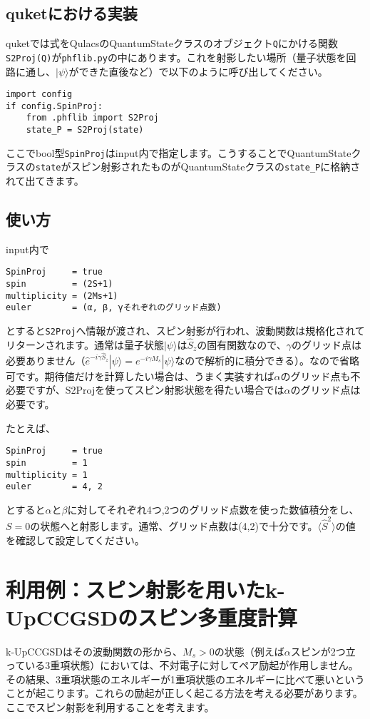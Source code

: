 \documentclass[prb,amsmath,amsfonts,amssymb]{revtex4}
\begin{document}
\subsection{quketにおける実装}
quketでは式\label{eq:Ps}をQulacsのQuantumStateクラスのオブジェクト{\tt Q}にかける関数{\tt S2Proj(Q)}が{\tt phflib.py}の中にあります。これを射影したい場所（量子状態を回路に通し、$|\psi\rangle$ができた直後など）で以下のように呼び出してください。

\begin{Verbatim}[frame=single, xleftmargin=4mm, xrightmargin=10mm]
import config
if config.SpinProj:
    from .phflib import S2Proj
    state_P = S2Proj(state)
\end{Verbatim}
ここでbool型{\tt SpinProj}はinput内で指定します。こうすることでQuantumStateクラスの{\tt state}がスピン射影されたものがQuantumStateクラスの{\tt state\_P}に格納されて出てきます。


\subsection{使い方}
input内で
\begin{Verbatim}[frame=single, xleftmargin=4mm, xrightmargin=10mm]
SpinProj     = true
spin         = (2S+1)
multiplicity = (2Ms+1)
euler        = (α, β, γそれぞれのグリッド点数)
\end{Verbatim}
とすると{\tt S2Proj}へ情報が渡され、スピン射影が行われ、波動関数は規格化されてリターンされます。通常は量子状態$|\psi\rangle$は$\hat S_z$の固有関数なので、$\gamma$のグリッド点は必要ありません（$\hat e^{-i\gamma\hat S_z}|\psi\rangle = e^{-i \gamma M_s}|\psi\rangle$なので解析的に積分できる）。なので省略可です。期待値だけを計算したい場合は、うまく実装すれば$\alpha$のグリッド点も不必要ですが、S2Projを使ってスピン射影状態を得たい場合では$\alpha$のグリッド点は必要です。

たとえば、
\begin{Verbatim}[frame=single, xleftmargin=4mm, xrightmargin=10mm]
SpinProj     = true
spin         = 1
multiplicity = 1
euler        = 4, 2
\end{Verbatim}
とすると$\alpha$と$\beta$に対してそれぞれ4つ,2つのグリッド点数を使った数値積分をし、$S=0$の状態へと射影します。通常、グリッド点数は(4,2)で十分です。$\langle \hat S^2\rangle$の値を確認して設定してください。


\section{利用例：スピン射影を用いたk-UpCCGSDのスピン多重度計算}
k-UpCCGSDはその波動関数の形から、$M_s>0$の状態（例えば$\alpha$スピンが2つ立っている3重項状態）においては、不対電子に対してペア励起が作用しません。その結果、3重項状態のエネルギーが1重項状態のエネルギーに比べて悪いということが起こります。これらの励起が正しく起こる方法を考える必要があります。ここでスピン射影を利用することを考えます。
\end{document}
